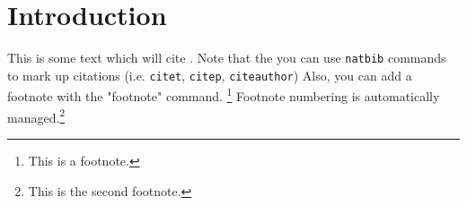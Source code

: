 \graphicspath{{mainmatter/2/figures/}}


\chapter{Introduction}\label{chapt:introduction}


This is some text which will cite \citet{Einstein:1905:EBK}.
Note that the you can use \texttt{natbib} commands to mark up citations (i.e. \texttt{citet}, \texttt{citep}, \texttt{citeauthor})
Also, you can add a footnote with the "footnote" command. \footnote{This is a footnote.}
Footnote numbering is automatically managed.\footnote{This is the second footnote.}
